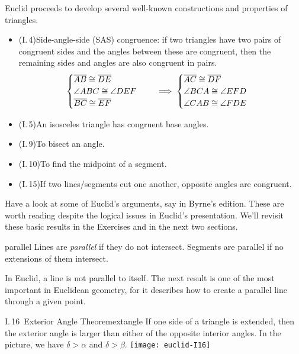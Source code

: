 Euclid proceeds to develop several well-known constructions and properties of triangles.
\begin{itemize}\itemsep0pt
  \item (I.\,4)\lstsp Side-angle-side (SAS) congruence: if two triangles have two pairs of congruent sides and the angles between these are congruent, then the remaining sides and angles are also congruent in pairs.
  \[
  	\begin{cases}
		  \overline{AB}\cong\overline{DE}\\
		  \angle ABC\cong\angle DEF\\
		  \overline{BC}\cong\overline{EF}
 	 	\end{cases}
  	\quad\implies
  	\begin{cases}
		  \overline{AC}\cong\overline{DF}\\
		  \angle BCA\cong\angle EFD\\
		  \angle CAB\cong\angle FDE
  	\end{cases}
  \]
  \item (I.\,5)\lstsp An isosceles triangle has congruent base angles.
  \item (I.\,9)\lstsp To bisect an angle.
  \item (I.\,10)\lstsp To find the midpoint of a segment.
  \item (I.\,15)\lstsp If two lines/segments cut one another, opposite angles are congruent.
\end{itemize}
Have a look at some of Euclid's arguments, say in Byrne's edition. These are worth reading despite the logical issues in Euclid's presentation. We'll revisit these basic results in the Exercises and in the next two sections. 

\goodbreak


\label{pg:parallelexist}

\begin{defn}{}{parallel}
	Lines are \emph{parallel} if they do not intersect. Segments are parallel if no extensions of them intersect.
\end{defn}

In Euclid, a line is not parallel to itself. The next result is one of the most important in Euclidean geometry, for it describes how to create a parallel line through a given point.


\begin{thm}[lower separated=false, sidebyside, sidebyside align=top seam, sidebyside gap=0pt, righthand width=0.37\linewidth]{I.\,16\ Exterior Angle Theorem}{extangle}
	If one side of a triangle is extended, then the exterior angle is larger than either of the opposite interior angles.\smallbreak
	In the picture, we have $\delta>\alpha$ and $\delta>\beta$.
	\tcblower
	\flushright\texttt{[image: euclid-I16]}
\end{thm}


